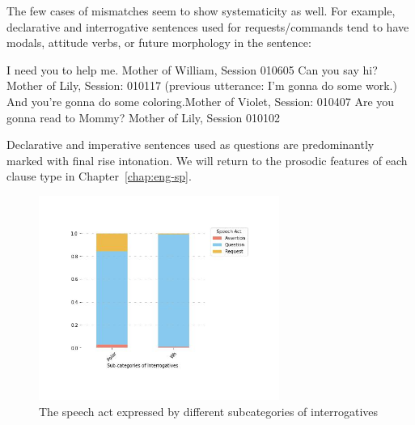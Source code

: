 The few cases of mismatches seem to show systematicity as well. For example, declarative and interrogative sentences used for requests/commands tend to have modals, attitude verbs, or future morphology in the sentence:

\bxl{}	I need you to help me.		\hfill	Mother of William, Session 010605
\ex	Can you say hi?				\hfill	Mother of Lily, Session: 010117
\ex	(previous utterance: I'm gonna do some work.)\\
And you’re gonna do some coloring.\hfill		Mother of Violet, Session: 010407
\ex  Are you gonna read to Mommy?	\hfill	Mother of Lily, Session 010102
\exl
\eex 

Declarative and imperative sentences used as questions  are predominantly marked with final rise intonation. We will return to the prosodic features of each clause type in Chapter~\ref{chap:eng-sp}.

\begin{figure}[H]
    \centering
    \includegraphics[width=0.7\textwidth]{figures/real-subIsp.jpg}
    \caption{The speech act expressed by different subcategories of interrogatives}
    \label{fig:real-subIsp}
\end{figure}




